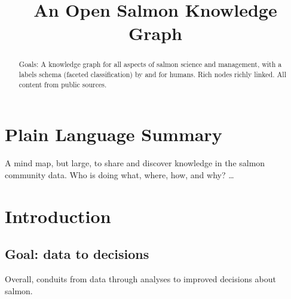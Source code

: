 \documentclass[
]{agujournal2019}
\begin{document}
\title{An Open Salmon Knowledge Graph}



\begin{abstract}
Goals: A knowledge graph for all aspects of salmon science and
management, with a labels schema (faceted classification) by and for
humans. Rich nodes richly linked. All content from public sources.
\end{abstract}

\section*{Plain Language Summary}
A mind map, but large, to share and discover knowledge in the salmon
community data. Who is doing what, where, how, and why? \ldots{}



\section{Introduction}\label{introduction}

\subsection{Goal: data to decisions}\label{goal-data-to-decisions}

Overall, conduits from data through analyses to improved decisions about
salmon.
\end{document}
